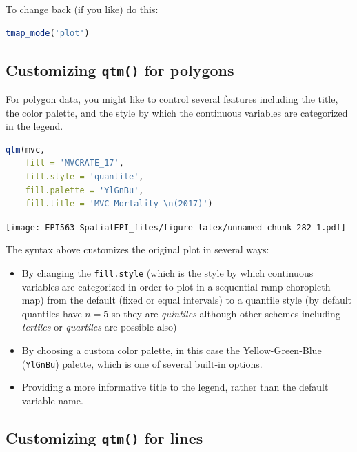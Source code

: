\documentclass[
]{book}
\newcommand{\passthrough}[1]{#1}
\providecommand{\tightlist}{%
  \setlength{\itemsep}{0pt}\setlength{\parskip}{0pt}}
\begin{document}
To change back (if you like) do this:

\begin{lstlisting}[language=R]
tmap_mode('plot')
\end{lstlisting}

\hypertarget{customizing-qtm-for-polygons}{%
\subsection{\texorpdfstring{Customizing \texttt{qtm()} for polygons}{Customizing qtm() for polygons}}\label{customizing-qtm-for-polygons}}

For polygon data, you might like to control several features including the title, the color palette, and the style by which the continuous variables are categorized in the legend.

\begin{lstlisting}[language=R]
qtm(mvc,
    fill = 'MVCRATE_17', 
    fill.style = 'quantile', 
    fill.palette = 'YlGnBu',
    fill.title = 'MVC Mortality \n(2017)')
\end{lstlisting}

\texttt{[image: EPI563-SpatialEPI\_files/figure-latex/unnamed-chunk-282-1.pdf]}

The syntax above customizes the original plot in several ways:

\begin{itemize}
\tightlist
\item
  By changing the \passthrough{\lstinline!fill.style!} (which is the style by which continuous variables are categorized in order to plot in a sequential ramp choropleth map) from the default (fixed or equal intervals) to a quantile style (by default quantiles have \(n=5\) so they are \emph{quintiles} although other schemes including \emph{tertiles} or \emph{quartiles} are possible also)
\item
  By choosing a custom color palette, in this case the Yellow-Green-Blue (\passthrough{\lstinline!YlGnBu!}) palette, which is one of several built-in options.
\item
  Providing a more informative title to the legend, rather than the default variable name.
\end{itemize}

\hypertarget{customizing-qtm-for-lines}{%
\subsection{\texorpdfstring{Customizing \texttt{qtm()} for lines}{Customizing qtm() for lines}}\label{customizing-qtm-for-lines}}
\end{document}
